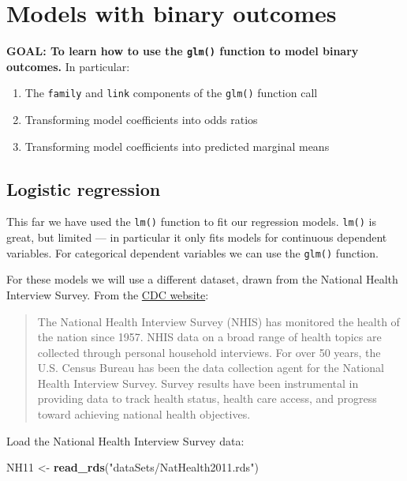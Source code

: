 \documentclass[]{book}
\newenvironment{Shaded}{\begin{snugshade}}{\end{snugshade}}
\newcommand{\KeywordTok}[1]{\textcolor[rgb]{0.13,0.29,0.53}{\textbf{#1}}}
\newcommand{\NormalTok}[1]{#1}
\newcommand{\StringTok}[1]{\textcolor[rgb]{0.31,0.60,0.02}{#1}}
\providecommand{\tightlist}{%
  \setlength{\itemsep}{0pt}\setlength{\parskip}{0pt}}
\begin{document}
\hypertarget{models-with-binary-outcomes}{%
\section{Models with binary outcomes}\label{models-with-binary-outcomes}}

\textbf{GOAL: To learn how to use the \texttt{glm()} function to model binary outcomes.} In particular:

\begin{enumerate}
\def\labelenumi{\arabic{enumi}.}
\tightlist
\item
  The \texttt{family} and \texttt{link} components of the \texttt{glm()} function call
\item
  Transforming model coefficients into odds ratios
\item
  Transforming model coefficients into predicted marginal means
\end{enumerate}

\hypertarget{logistic-regression}{%
\subsection{Logistic regression}\label{logistic-regression}}

This far we have used the \texttt{lm()} function to fit our regression models. \texttt{lm()} is great, but limited --- in particular it only fits models for continuous dependent variables. For categorical dependent variables we can use the \texttt{glm()} function.

For these models we will use a different dataset, drawn from the National Health Interview Survey. From the \href{http://www.cdc.gov/nchs/nhis.htm}{CDC website}:

\begin{quote}
The National Health Interview Survey (NHIS) has monitored the health of the nation since 1957. NHIS data on a broad range of health topics are collected through personal household interviews. For over 50 years, the U.S. Census Bureau has been the data collection agent for the National Health Interview Survey. Survey results have been instrumental in providing data to track health status, health care access, and progress toward achieving national health objectives.
\end{quote}

Load the National Health Interview Survey data:

\begin{Shaded}
\begin{Highlighting}[]
\NormalTok{  NH11 <-}\StringTok{ }\KeywordTok{read_rds}\NormalTok{(}\StringTok{"dataSets/NatHealth2011.rds"}\NormalTok{)}
\end{Highlighting}
\end{Shaded}
\end{document}
